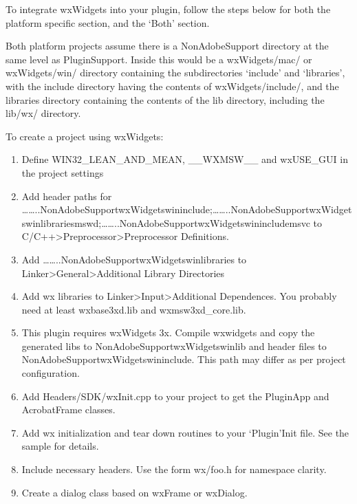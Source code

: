 \documentclass[letterpaper,12pt,english,openany,oneside]{sphinxmanual}
\begin{document}
To integrate wxWidgets into your plugin, follow the steps below for both the platform specific section, and the ‘Both’ section.

Both platform projects assume there is a NonAdobeSupport directory at the same level as PluginSupport. Inside this would be a wxWidgets/mac/ or wxWidgets/win/ directory containing the sub\sphinxhyphen{}directories ‘include’ and ‘libraries’, with the include directory having the contents of wxWidgets/include/, and the libraries directory containing the contents of the lib directory, including the lib/wx/ directory.

To create a project using wxWidgets:
\begin{enumerate}
%
\item {} 
Define WIN32\_LEAN\_AND\_MEAN, \_\_WXMSW\_\_ and wxUSE\_GUI in the project settings

\item {} 
Add header paths for ……..NonAdobeSupportwxWidgetswininclude;……..NonAdobeSupportwxWidgetswinlibrariesmswd;……..NonAdobeSupportwxWidgetswinincludemsvc to C/C++\sphinxhyphen{}>Preprocessor\sphinxhyphen{}>Preprocessor Definitions.

\item {} 
Add ……..NonAdobeSupportwxWidgetswinlibraries to Linker\sphinxhyphen{}>General\sphinxhyphen{}>Additional Library Directories

\item {} 
Add wx libraries to Linker\sphinxhyphen{}>Input\sphinxhyphen{}>Additional Dependences. You probably need at least wxbase3xd.lib and wxmsw3xd\_core.lib.

\item {} 
This plugin requires wxWidgets 3x. Compile wxwidgets and copy the generated libs to NonAdobeSupportwxWidgetswinlib and header files to NonAdobeSupportwxWidgetswininclude. This path may differ as per project configuration.

\item {} 
Add Headers/SDK/wxInit.cpp to your project to get the PluginApp and AcrobatFrame classes.

\item {} 
Add wx initialization and tear down routines to your ‘Plugin’Init file. See the sample for details.

\item {} 
Include necessary headers. Use the form wx/foo.h for namespace clarity.

\item {} 
Create a dialog class based on wxFrame or wxDialog.

\end{enumerate}
\end{document}
